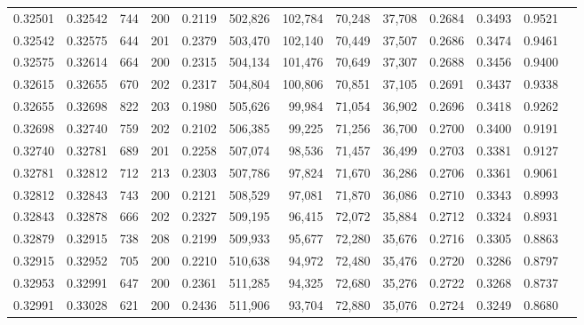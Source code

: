 \begin{tabular}{rrrrrrrrrrrrr}
0.32501 & 0.32542 &   744 & 200 &                                     0.2119 & 502,826 & 102,784 &  70,248 &  37,708 & 0.2684 & 0.3493 & 0.9521 \\
0.32542 & 0.32575 &   644 & 201 &                                     0.2379 & 503,470 & 102,140 &  70,449 &  37,507 & 0.2686 & 0.3474 & 0.9461 \\
0.32575 & 0.32614 &   664 & 200 &                                     0.2315 & 504,134 & 101,476 &  70,649 &  37,307 & 0.2688 & 0.3456 & 0.9400 \\
0.32615 & 0.32655 &   670 & 202 &                                     0.2317 & 504,804 & 100,806 &  70,851 &  37,105 & 0.2691 & 0.3437 & 0.9338 \\
0.32655 & 0.32698 &   822 & 203 &                                     0.1980 & 505,626 &  99,984 &  71,054 &  36,902 & 0.2696 & 0.3418 & 0.9262 \\
0.32698 & 0.32740 &   759 & 202 &                                     0.2102 & 506,385 &  99,225 &  71,256 &  36,700 & 0.2700 & 0.3400 & 0.9191 \\
0.32740 & 0.32781 &   689 & 201 &                                     0.2258 & 507,074 &  98,536 &  71,457 &  36,499 & 0.2703 & 0.3381 & 0.9127 \\
0.32781 & 0.32812 &   712 & 213 &                                     0.2303 & 507,786 &  97,824 &  71,670 &  36,286 & 0.2706 & 0.3361 & 0.9061 \\
0.32812 & 0.32843 &   743 & 200 &                                     0.2121 & 508,529 &  97,081 &  71,870 &  36,086 & 0.2710 & 0.3343 & 0.8993 \\
0.32843 & 0.32878 &   666 & 202 &                                     0.2327 & 509,195 &  96,415 &  72,072 &  35,884 & 0.2712 & 0.3324 & 0.8931 \\
0.32879 & 0.32915 &   738 & 208 &                                     0.2199 & 509,933 &  95,677 &  72,280 &  35,676 & 0.2716 & 0.3305 & 0.8863 \\
0.32915 & 0.32952 &   705 & 200 &                                     0.2210 & 510,638 &  94,972 &  72,480 &  35,476 & 0.2720 & 0.3286 & 0.8797 \\
0.32953 & 0.32991 &   647 & 200 &                                     0.2361 & 511,285 &  94,325 &  72,680 &  35,276 & 0.2722 & 0.3268 & 0.8737 \\
0.32991 & 0.33028 &   621 & 200 &                                     0.2436 & 511,906 &  93,704 &  72,880 &  35,076 & 0.2724 & 0.3249 & 0.8680 \\

\end{tabular}
